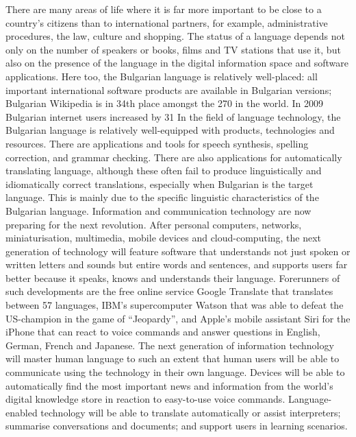 \begin{multicols}{2}
There are many areas of life where it is far more important to be close to a country’s citizens than to international partners, for example, administrative procedures, the law, culture and shopping. The status of a language depends not only on the number of speakers or books, films and TV stations that use it, but also on the presence of the language in the digital information space and software applications. 
Here too, the Bulgarian language is relatively well-placed: all important international software products are available in Bulgarian versions; Bulgarian Wikipedia is in 34th place amongst the 270 in the world. In 2009 Bulgarian internet users increased by 31%
In the field of language technology, the Bulgarian language is relatively well-equipped with products, technologies and resources. There are applications and tools for speech synthesis, spelling correction, and grammar checking. There are also applications for automatically translating language, although these often fail to produce linguistically and idiomatically correct translations, especially when Bulgarian is the target language. This is mainly due to the specific linguistic characteristics of the Bulgarian language. 
Information and communication technology are now preparing for the next revolution. After personal computers, networks, miniaturisation, multimedia, mobile devices and cloud-computing, the next generation of technology will feature software that understands not just spoken or written letters and sounds but entire words and sentences, and supports users far better because it speaks, knows and understands their language. Forerunners of such developments are the free online service Google Translate that translates between 57 languages, IBM’s supercomputer Watson that was able to defeat the US-champion in the game of “Jeopardy”, and Apple’s mobile assistant Siri for the iPhone that can react to voice commands and answer questions in English, German, French and Japanese. 
The next generation of information technology will master human language to such an extent that human users will be able to communicate using the technology in their own language. Devices will be able to automatically find the most important news and information from the world’s digital knowledge store in reaction to easy-to-use voice commands. Language-enabled technology will be able to translate automatically or assist interpreters; summarise conversations and documents; and support users in learning scenarios. 


\end{multicols}
